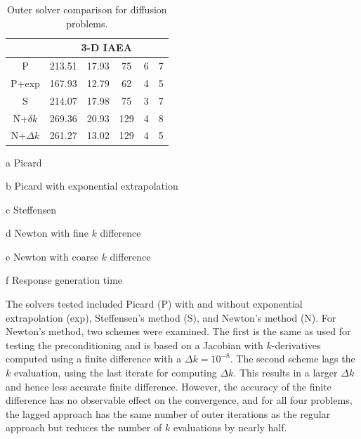 \begin{table}[!]
\begin{center}
\begin{threeparttable}
\begin{tabular}{cccccc}
 \midrule 
 &  \multicolumn{5}{c}{3-D IAEA} \\ 
 \midrule 
        P &    213.51 &     17.93 &           75 &            6 &            7 \\ 
    P+exp &    167.93 &     12.79 &           62 &            4 &            5 \\ 
    S &    214.07 &     17.98 &           75 &            3 &            7 \\ 
  N+$\delta k$ &    269.36 &     20.93 &          129 &            4 &            8 \\ 
  N+$\Delta k$ &    261.27 &     13.02 &          129 &            4 &            5 \\ 
 \bottomrule 
 \end{tabular} 

 {\footnotesize
 \begin{tablenotes}
   \item[a] Picard 
   \item[b] Picard with exponential extrapolation
   \item[c] Steffensen
   \item[d] Newton with fine $k$ difference
   \item[e] Newton with coarse $k$ difference
   \item[f] Response generation time
 \end{tablenotes}
 }
 \end{threeparttable}
 
 \end{center} 
 
 \caption{Outer solver comparison for diffusion problems.} 
 \label{tbl:diffusion_outer_study} 
 
\end{table} 


The solvers tested included Picard (P) with and without exponential 
extrapolation (exp), Steffensen's method (S), and Newton's method (N).
For Newton's method, two schemes were examined.  The first is the same 
as used for testing the preconditioning and is based on a Jacobian with 
$k$-derivatives computed using a finite difference 
with a $\Delta k = 10^{-8}$.
The second scheme 
lags the $k$ evaluation, using the last iterate 
for computing $\Delta k$.  This results in a larger $\Delta k$ and hence 
less accurate finite difference.  However, the accuracy of the finite 
difference has no observable effect on the convergence, 
and for all four problems,
the lagged approach has the same number of outer iterations as the 
regular approach but reduces the number of $k$ evaluations by nearly half.

